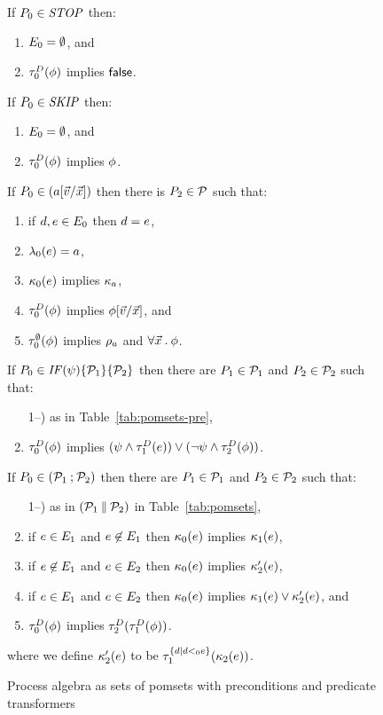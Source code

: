 \begin{figure*}
  If $\aPS_0\in\sSTOP$ then:
  \begin{enumerate}
    \item $\aEvs_0 = \emptyset$, and
  \item $\aTr[\bEvs]_0(\aForm)$ implies $\FALSE$.
  \end{enumerate}
  If $\aPS_0\in\sSKIP$ then:
  \begin{enumerate}
  \item $\aEvs_0 = \emptyset$, and
  \item $\aTr[\bEvs]_0(\aForm)$ implies $\aForm$.
  \end{enumerate}
  If $\aPS_0 \in (\aAct[\vec\aVal/\vec\aVar])$ then there is $\aPS_2\in\aPSS$ such that:
  \begin{enumerate}
  \item if $\bEv,\aEv\in\aEvs_0$ then $\bEv=\aEv$,
  \item $\labelingAct_0(\aEv) = \aAct$,
  \item $\labelingForm_0(\aEv)$ implies $\preForm_\aAct$,
  \item $\aTr[\bEvs]_0(\aForm)$ implies $\aForm[\vec\aVal/\vec\aVar]$, and
  \item $\aTr[\emptyset]_0(\aForm)$ implies $\reorderIndForm_\aAct$ and $\forall\vec\aVar\DOT\aForm$.
  \end{enumerate}
  If $\aPS_0 \in \sIF{\bForm}\sTHEN\aPSS_1\sELSE\aPSS_2\sFI$ then
  there are $\aPS_1\in\aPSS_1$ and $\aPS_2\in\aPSS_2$ such that:
  \begin{enumerate}
  \setcounter{enumi}{\value{pomsetPreIfCount}}
  \item[1--\thepomsetPreIfCount)] as in Table~\ref{tab:pomsets-pre},
  \item $\aTr[\bEvs]_0(\aForm)$ implies $(\bForm\land\aTr[\bEvs]_1(\aEv))\lor(\neg\bForm\land\aTr[\bEvs]_2(\aForm))$.
  \end{enumerate}
  If $\aPS_0 \in (\aPSS_1\wSEMI\aPSS_2)$ then
  there are $\aPS_1\in\aPSS_1$ and $\aPS_2\in\aPSS_2$ such that:
  \begin{enumerate}
  \setcounter{enumi}{\value{pomsetwParCount}}
  \item[1--\thepomsetwParCount)] as in $(\aPSS_1\sPAR\aPSS_2)$  in Table~\ref{tab:pomsets},
  \item if $\aEv\in\aEvs_1$ and $\aEv\not\in\aEvs_1$ then $\labelingForm_0(\aEv)$ implies $\labelingForm_1(\aEv)$,
  \item if $\aEv\not\in\aEvs_1$ and $\aEv\in\aEvs_2$ then $\labelingForm_0(\aEv)$ implies $\labelingForm'_2(\aEv)$,
  \item if $\aEv\in\aEvs_1$ and $\aEv\in\aEvs_2$ then $\labelingForm_0(\aEv)$ implies $\labelingForm_1(\aEv)\lor\labelingForm'_2(\aEv)$, and
  \item $\aTr[\bEvs]_0(\aForm)$ implies $\aTr[\bEvs]_2(\aTr[\bEvs]_1(\aForm))$.
  \end{enumerate}
  where we define $\labelingForm'_2(\aEv)$ to be $\aTr[\{ \bEv \mid \bEv <_0 \aEv \}]_1(\labelingForm_2(\aEv))$.
\caption{Process algebra as sets of pomsets with preconditions and predicate transformers}
\end{figure*}

